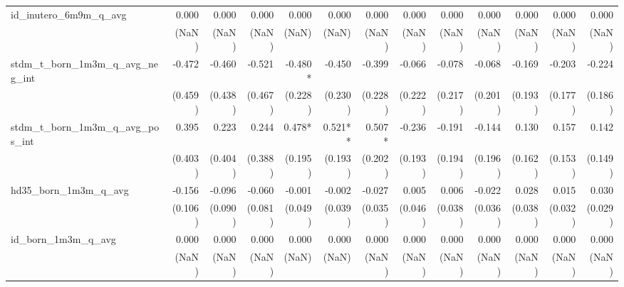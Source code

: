 \begin{tabular}{lrrrrrrrrrrrr}
id\_inutero\_6m9m\_q\_avg                   &        0.000 &        0.000 &        0.000 &        0.000 &        0.000 &        0.000 &        0.000 &        0.000 &        0.000 &        0.000 &        0.000 &        0.000 \\ 
                                            &        (NaN) &        (NaN) &        (NaN) &        (NaN) &        (NaN) &        (NaN) &        (NaN) &        (NaN) &        (NaN) &        (NaN) &        (NaN) &        (NaN) \\ 
stdm\_t\_born\_1m3m\_q\_avg\_neg\_int       &       -0.472 &       -0.460 &       -0.521 &      -0.480* &       -0.450 &       -0.399 &       -0.066 &       -0.078 &       -0.068 &       -0.169 &       -0.203 &       -0.224 \\ 
                                            &      (0.459) &      (0.438) &      (0.467) &      (0.228) &      (0.230) &      (0.228) &      (0.222) &      (0.217) &      (0.201) &      (0.193) &      (0.177) &      (0.186) \\ 
stdm\_t\_born\_1m3m\_q\_avg\_pos\_int       &        0.395 &        0.223 &        0.244 &       0.478* &      0.521** &       0.507* &       -0.236 &       -0.191 &       -0.144 &        0.130 &        0.157 &        0.142 \\ 
                                            &      (0.403) &      (0.404) &      (0.388) &      (0.195) &      (0.193) &      (0.202) &      (0.193) &      (0.194) &      (0.196) &      (0.162) &      (0.153) &      (0.149) \\ 
hd35\_born\_1m3m\_q\_avg                    &       -0.156 &       -0.096 &       -0.060 &       -0.001 &       -0.002 &       -0.027 &        0.005 &        0.006 &       -0.022 &        0.028 &        0.015 &        0.030 \\ 
                                            &      (0.106) &      (0.090) &      (0.081) &      (0.049) &      (0.039) &      (0.035) &      (0.046) &      (0.038) &      (0.036) &      (0.038) &      (0.032) &      (0.029) \\ 
id\_born\_1m3m\_q\_avg                      &        0.000 &        0.000 &        0.000 &        0.000 &        0.000 &        0.000 &        0.000 &        0.000 &        0.000 &        0.000 &        0.000 &        0.000 \\ 
                                            &        (NaN) &        (NaN) &        (NaN) &        (NaN) &        (NaN) &        (NaN) &        (NaN) &        (NaN) &        (NaN) &        (NaN) &        (NaN) &        (NaN) \\ 

\end{tabular}
